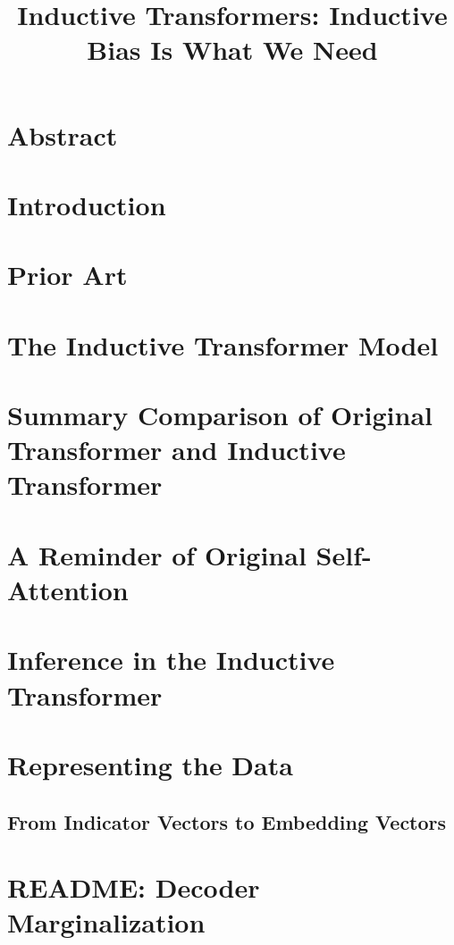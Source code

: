 \title{Inductive Transformers: Inductive Bias Is What We Need}


\section{Abstract}

\section{Introduction}

\section{Prior Art}

\section{The Inductive Transformer Model}



\section{Summary Comparison of Original Transformer and Inductive Transformer}

\section{A Reminder of Original Self-Attention}



\section{Inference in the Inductive Transformer}

\section{Representing the Data}

\subsection{From Indicator Vectors to Embedding Vectors}

\section{README: Decoder Marginalization}

